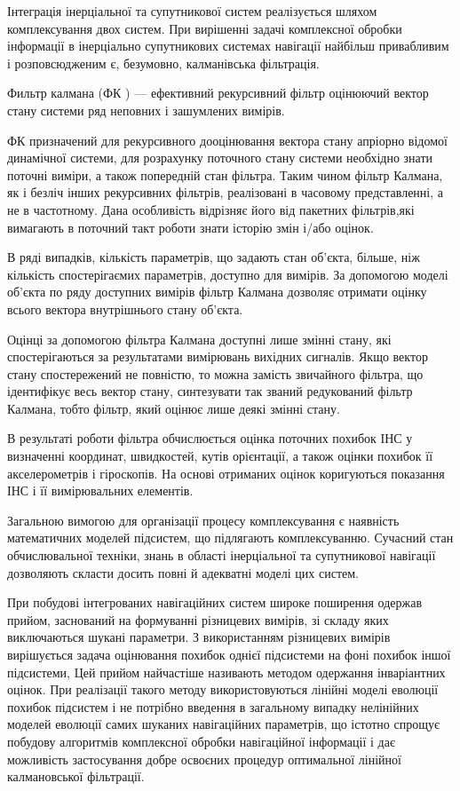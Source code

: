 Інтеграція інерціальної та супутникової систем реалізується шляхом комплексування двох
систем. При вирішенні задачі комплексної обробки інформації в інерціально супутникових
системах навігації найбільш привабливим і розповсюдженим є, безумовно, калманівська 
фільтрація.

Фильтр калмана (ФК ) --- ефективний рекурсивний фільтр оцінюючий вектор стану системи
ряд неповних і зашумлених вимірів.

ФК призначений для рекурсивного дооцінювання вектора стану апріорно відомої динамічної
системи, для розрахунку поточного стану системи необхідно знати поточні виміри, а
також попередній стан фільтра. Таким чином фільтр Калмана, як і безліч інших
рекурсивних фільтрів, реалізовані в часовому представленні, а не в частотному.
Дана особливість відрізняє його від пакетних фільтрів,які вимагають в поточний
такт роботи знати історію змін і/або оцінок.

В ряді випадків, кількість параметрів, що задають стан об'єкта, більше, ніж кількість
спостерігаємих параметрів, доступно для вимірів. За допомогою моделі об'єкта
по ряду доступних вимірів фільтр Калмана дозволяє отримати оцінку всього вектора
внутрішнього стану об'єкта. 

Оцінці за допомогою фільтра Калмана доступні лише змінні стану, які спостерігаються 
за результатами вимірювань вихідних сигналів. Якщо вектор стану спостережений не 
повністю, то можна замість звичайного фільтра, що ідентифікує весь вектор стану, 
синтезувати так званий редукований фільтр Калмана, тобто фільтр, який оцінює лише 
деякі змінні стану.

В результаті роботи фільтра обчислюється оцінка поточних похибок ІНС 
у визначенні координат, швидкостей, кутів орієнтації, а також оцінки 
похибок її акселерометрів і гіроскопів. На основі отриманих оцінок 
коригуються показання ІНС і її вимірювальних елементів.

Загальною вимогою для організації процесу комплексування є наявність 
математичних моделей підсистем, що підлягають комплексуванню. Сучасний 
стан обчислювальної техніки, знань в області інерціальної та супутникової 
навігації дозволяють скласти досить повні й адекватні моделі цих систем.

При побудові інтегрованих  навігаційних систем широке поширення одержав 
прийом, заснований на формуванні різницевих вимірів, зі складу яких 
виключаються шукані параметри. З використанням різницевих вимірів  
вирішується задача оцінювання похибок однієї підсистеми на фоні 
похибок іншої підсистеми, Цей прийом  найчастіше називають методом 
одержання інваріантних оцінок. При реалізації такого методу 
використовуються лінійні моделі еволюції похибок підсистем  
і не потрібно введення в загальному випадку нелінійних моделей еволюції 
самих шуканих навігаційних параметрів, що істотно спрощує побудову 
алгоритмів комплексної обробки навігаційної інформації і дає можливість 
застосування добре освоєних процедур оптимальної  лінійної 
калмановської фільтрації.


